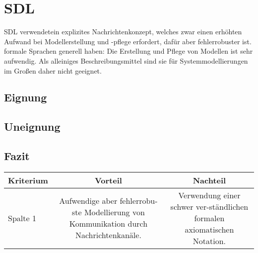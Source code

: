 \section{SDL}
\label{sc:SDLB}
SDL verwendetein  explizites  Nachrichtenkonzept,  welches  zwar  einen  erhöhten  Aufwand  bei  Modellerstellung und -pflege erfordert, dafür aber fehlerrobuster ist. 
formale Sprachen generell haben: Die Erstellung und Pflege von Modellen ist sehr aufwendig. Als alleiniges Beschreibungsmittel sind sie für Systemmodellierungen im Großen daher nicht geeignet.
\subsection{Eignung}

\subsection{Uneignung}

\subsection{Fazit}

\begin{tabular}{|l|c|c|}
	\hline
	Kriterium & Vorteil & Nachteil  \\
	\hline
	Spalte 1 & Aufwendige aber fehlerrobu-ste Modellierung von Kommunikation durch Nachrichtenkanäle. & Verwendung einer schwer ver-ständlichen formalen axiomatischen Notation. \\
	\hline
	\hline
\end{tabular}